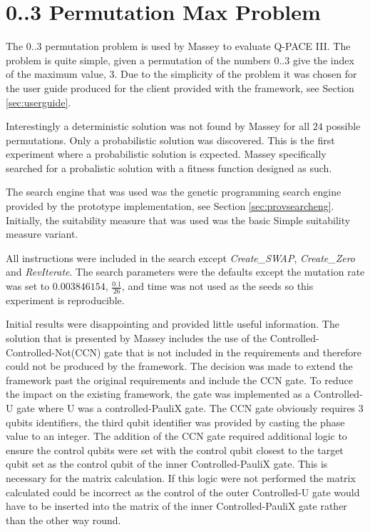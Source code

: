 \section{0..3 Permutation Max Problem}
\label{sec:maxproblemexp}

The $0..3$ permutation problem is used by Massey\cite{masseythesis} to evaluate Q-PACE III.
The problem is quite simple, given a permutation of the numbers $0..3$ give the index of the maximum value, $3$.
Due to the simplicity of the problem it was chosen for the user guide produced for the client provided with the framework, see Section \ref{sec:userguide}.

Interestingly a deterministic solution was not found by Massey for all $24$ possible permutations.
Only a probabilistic solution was discovered.
This is the first experiment where a probabilistic solution is expected.
Massey specifically searched for a probalistic solution with a fitness function designed as such.

The search engine that was used was the genetic programming search engine provided by the prototype implementation, see Section \ref{sec:provsearcheng}.
Initially, the suitability measure that was used was the basic Simple suitability measure variant.

All instructions were included in the search except \emph{Create\_SWAP}, \emph{Create\_Zero} and \emph{RevIterate}.
The search parameters were the defaults except the mutation rate was set to $0.003846154$, $\frac{0.1}{26}$, and time was not used as the seeds so this experiment is reproducible.

Initial results were disappointing and provided little useful information.
The solution that is presented by Massey includes the use of the Controlled-Controlled-Not(CCN) gate that is not included in the requirements and therefore could not be produced by the framework.
The decision was made to extend the framework past the original requirements and include the CCN gate.
To reduce the impact on the existing framework, the gate was implemented as a Controlled-U gate where U was a controlled-PauliX gate.
The CCN gate obviously requires 3 qubits identifiers, the third qubit identifier was provided by casting the phase value to an integer.
The addition of the CCN gate required additional logic to ensure the control qubits were set with the control qubit closest to the target qubit set as the control qubit of the inner Controlled-PauliX gate.
This is necessary for the matrix calculation.
If this logic were not performed the matrix calculated could be incorrect as the control of the outer Controlled-U gate would have to be inserted into the matrix of the inner Controlled-PauliX gate rather than the other way round.

